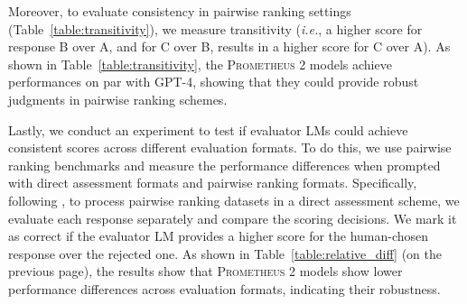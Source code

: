 \documentclass[11pt]{article}
\begin{document}
Moreover, to evaluate consistency in pairwise ranking settings (Table~\ref{table:transitivity}), we measure transitivity (\textit{i.e.}, a higher score for response B over A, and for C over B, results in a higher score for C over A). As shown in Table~\ref{table:transitivity}, the \textsc{Prometheus 2} models achieve performances on par with GPT-4, showing that they could provide robust judgments in pairwise ranking schemes.

Lastly, we conduct an experiment to test if evaluator LMs could achieve consistent scores across different evaluation formats. To do this, we use pairwise ranking benchmarks and measure the performance differences when prompted with direct assessment formats and pairwise ranking formats. Specifically, following \citet{kim2023prometheus}, to process pairwise ranking datasets in a direct assessment scheme, we evaluate each response separately and compare the scoring decisions. We mark it as correct if the evaluator LM provides a higher score for the human-chosen response over the rejected one. As shown in Table~\ref{table:relative_diff} (on the previous page), the results show that \textsc{Prometheus 2} models show lower performance differences across evaluation formats, indicating their robustness.

\clearpage

\begin{table}[t!]
\fontsize{7}{9}\selectfont
\centering
{}
\caption{\footnotesize Pearson correlations between different evaluator models with and without the reference answer and Human. Reference-based evaluations outperform reference-free evaluations across all evaluator LMs.}
\label{tab:ref_no_ref}
\end{table}
\end{document}
